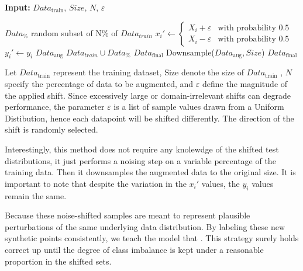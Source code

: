 \begin{algorithm}[H]
    \vspace{0.6em}
    \textbf{Input:} $Data_{\text{train}}$, $Size$, $N$, $\varepsilon$
    \vspace{0.6em}
    \begin{algorithmic}[1]
        \State $Data_{\%}$ \leftarrow random subset of N\% of $Data_{train}$
            \vspace{0.6em}
            \State $x_i' \leftarrow 
            \begin{cases}
                X_i + \varepsilon & \text{with probability } 0.5 \\
                X_i - \varepsilon & \text{with probability } 0.5
            \end{cases}$
            \State $y_i' \leftarrow y_i$
            \vspace{0.6em}
        \EndFor
        \vspace{0.6em}
        \State $Data_\text{aug}$ \leftarrow $Data_{train} \cup Data_{\%}$
        \State $Data_\text{final}$ \leftarrow Downsample($Data_\text{aug}, Size$)
        \vspace{0.6em}
        \State \Return $Data_{\text{final}}$
    \end{algorithmic}
    \caption{Let $Data_{\text{train}}$ represent the training dataset, $\text{Size}$ denote the size of $Data_{\text{train}}$ , $N$ specify the percentage of data to be augmented, and $\varepsilon$ define the magnitude of the applied shift. Since excessively large or domain-irrelevant shifts can degrade performance, the parameter $\varepsilon$ is a list of sample values drawn from a Uniform Distibution, hence each datapoint will be shifted differently. The direction of the shift is randomly selected.}
\end{algorithm}



Interestingly, this method does not require any knolewdge of the shifted test distributions, it just performs a noising step on a variable percentage of the training data. Then it downsamples the augmented data to the original size.
It is important to note that despite the variation in the $x_i'$ values, the $y_i$ values remain the same.

\begin{tcolorbox}[colback=gray!5,colframe=gray!40,title= Why Keep the Same Label?]
    Because these noise-shifted samples are meant to represent plausible perturbations of the same underlying data distribution. By labeling these new synthetic points consistently, we teach the model that . This strategy surely holds correct up until the degree of class imbalance is kept under a reasonable proportion in the shifted sets.
\end{tcolorbox}





